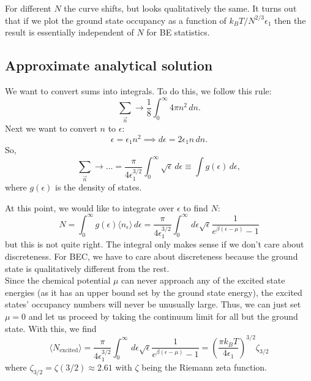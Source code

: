 \documentclass{book}
\theoremstyle{definition}
\newcommand{\be}{\beta}
\newcommand{\f}[2]{\frac{#1}{#2}}
\newcommand{\lp}{\left(}
\newcommand{\rp}{\right)}
\begin{document}
For different $N$ the curve shifts, but looks qualitatively the same. It turns out that if we plot the ground state occupancy as a function of $k_BT /N^{2/3}\epsilon_1$ then the result is essentially independent of $N$ for BE statistics. 





\subsection*{Approximate analytical solution}

We want to convert sums into integrals. To do this, we follow this rule:
\begin{equation*}
\sum_{\vec{n}} \to \f{1}{8}\int^\infty_0 4\pi n^2\,dn.
\end{equation*}
Next we want to convert $n$ to $\epsilon$:
\begin{equation*}
\epsilon = \epsilon_1 n^2 \implies d\epsilon = 2\epsilon_1 n\,dn.
\end{equation*}
So,
\begin{equation*}
\sum_{\vec{n}} \to \dots = \f{\pi}{4\epsilon_1^{3/2}} \int^\infty_0 \sqrt{\epsilon}\,d\epsilon \equiv \int g(\epsilon)\,d\epsilon,
\end{equation*}
where $g(\epsilon)$ is the density of states. 


At this point, we would like to integrate over $\epsilon$ to find $N$:
\begin{equation*}
N = \int^\infty_0 g(\epsilon)\langle n_\epsilon\rangle \,d\epsilon = \f{\pi}{4\epsilon_1^{3/2}}\int^\infty_0 \,d\epsilon \sqrt{\epsilon} \f{1}{e^{\be(\epsilon-\mu)} - 1}
\end{equation*}
but this is not quite right. The integral only makes sense if we don't care about discreteness. For BEC, we have to care about discreteness because the ground state is qualitatively different from the rest. \\


Since the chemical potential $\mu$ can never approach any of the excited state energies (as it has an upper bound set by the ground state energy), the excited states' occupancy numbers will never be unusually large. Thus, we can just set $\mu  =0$ and let us proceed by taking the continuum limit for all but the ground state. With this, we find 
\begin{equation*}
\langle N_{\text{excited}} \rangle =  \f{\pi}{4\epsilon_1^{3/2}}\int^\infty_0 \,d\epsilon \sqrt{\epsilon} \f{1}{e^{\be(\epsilon-\mu)} - 1} = \lp \f{\pi k_B T}{4\epsilon_1} \rp^{3/2} \zeta_{3/2}
\end{equation*}
where $\zeta_{3/2} = \zeta(3/2) \approx 2.61$ with $\zeta$ being the Riemann zeta function. \\
\end{document}
